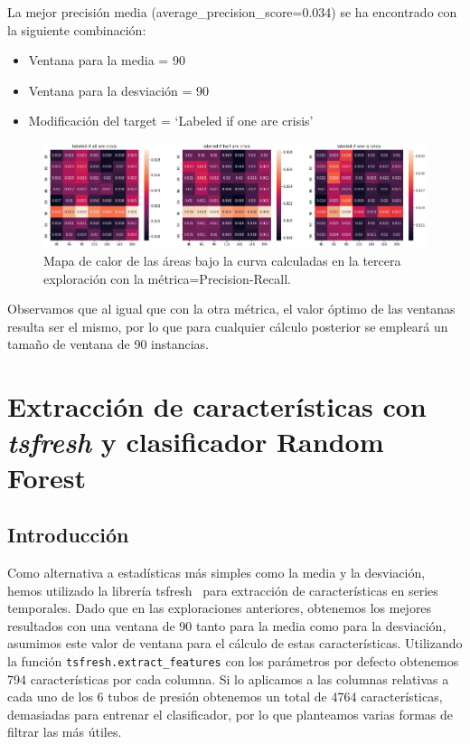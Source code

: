 \documentclass[a4paper,12pt,twoside,oldfontcommands]{memoir}
\begin{document}
La mejor precisión media (average\_precision\_score=0.034) se ha encontrado con la siguiente combinación: 
\begin{itemize}
    \item Ventana para la media = 90
    \item Ventana para la desviación = 90
    \item Modificación del target = `Labeled if one are crisis'
\end{itemize}

\begin{figure}
    \centering
    \includegraphics[width=1\textwidth]{images/heatmap6.png}
    \caption{Mapa de calor de las áreas bajo la curva calculadas en la tercera exploración con la métrica=Precision-Recall.}
    \label{fig:heatmap6}
\end{figure}

Observamos que al igual que con la otra métrica, el valor óptimo de las ventanas resulta ser el mismo, por lo que para cualquier cálculo posterior se empleará un tamaño de ventana de 90 instancias. 

\chapter{Extracción de características con \textit{tsfresh} y clasificador Random Forest}
\section{Introducción}
Como alternativa a estadísticas más simples como la media y la desviación, hemos utilizado la librería tsfresh~\cite{christ2018time} para extracción de características en series temporales. Dado que en las exploraciones anteriores, obtenemos los mejores resultados con una ventana de 90 tanto para la media como para la desviación, asumimos este valor de ventana para el cálculo de estas características. Utilizando la función \texttt{tsfresh.extract\_features} con los parámetros por defecto obtenemos 794 características por cada columna. Si lo aplicamos a las columnas relativas a cada uno de los 6 tubos de presión obtenemos un total de 4764 características, demasiadas para entrenar el clasificador, por lo que planteamos varias formas de filtrar las más útiles. 
\end{document}
